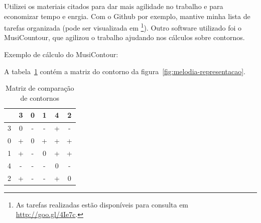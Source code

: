 \documentclass[11pt]{article}
\begin{document}


Utilizei os materiais citados para dar mais agilidade no trabalho e para
economizar tempo e enrgia. Com o Github por exemplo, mantive minha lista
de tarefas organizada
(pode ser visualizada em \footnote{As
  tarefas realizadas estão disponíveis para consulta em
  \url{http://goo.gl/4Ie7c}.}).
Outro software utilizado foi o MusiCountour,
  que agilizou o trabalho ajudando nos cálculos sobre contornos.

Exemplo de cálculo do MusiContour:

A tabela~\ref{tab:matriz-comparacao-contornos} contém a matriz do
contorno da figura~\ref{fig:melodia-representacao}.

\begin{table}
  \centering
  \begin{tabular}{c|ccccc}
    &3&0&1&4&2\\
    \hline
    3&0&-&-&+&-\\
    0&+&0&+&+&+\\
    1&+&-&0&+&+\\
    4&-&-&-&0&-\\
    2&+&-&-&+&0\\
  \end{tabular}
  \caption{Matriz de comparação de contornos}
  \label{tab:matriz-comparacao-contornos}
\end{table}
\end{document}
